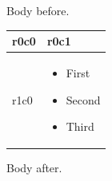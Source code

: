 \documentclass[11pt,a4paper]{article}
\begin{document}
Body before.

\begin{table}[h]
\begin{tabular}{|l|l|}
\hline
r0c0 & r0c1 \\ \hline
r1c0 & \begin{itemize} \item First \item Second \item Third \end{itemize} \\ \hline
\end{tabular}
\end{table}

Body after.
\end{document}
